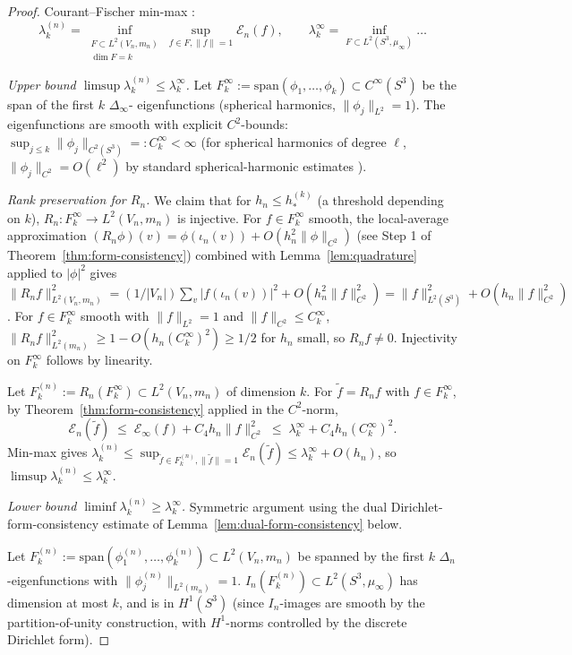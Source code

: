 \documentclass[11pt, a4paper]{amsart}
\theoremstyle{definition}
\begin{document}
\begin{proof}
Courant--Fischer min-max \cite[\S VIII.8]{Kato}:
\[
  \lambda_k^{(n)} = \inf_{\substack{F \subset L^2(V_n, m_n)\\
       \dim F = k}} \sup_{f \in F, \|f\| = 1}
       \mathcal E_n(f),
  \qquad \lambda_k^\infty = \inf_{F \subset L^2(S^3, \mu_\infty)}
       \ldots
\]

\emph{Upper bound $\limsup \lambda_k^{(n)} \leq \lambda_k^\infty$.}
Let $F_k^\infty := \mathrm{span}(\phi_1, \ldots, \phi_k) \subset
C^\infty(S^3)$ be the span of the first $k$ $\Delta_\infty$-
eigenfunctions (spherical harmonics, $\|\phi_j\|_{L^2} = 1$).
The eigenfunctions are smooth with explicit $C^2$-bounds:
$\sup_{j \leq k} \|\phi_j\|_{C^2(S^3)} =: C_k^\infty < \infty$
(for spherical harmonics of degree $\ell$, $\|\phi_j\|_{C^2} =
O(\ell^2)$ by standard spherical-harmonic estimates
\cite[Ch.~III]{BerardSpectralGeometry}).

\emph{Rank preservation for $R_n$.} We claim that for
$h_n \leq h_\ast^{(k)}$ (a threshold depending on $k$),
$R_n \colon F_k^\infty \to L^2(V_n, m_n)$ is injective. For
$f \in F_k^\infty$ smooth, the local-average approximation
$(R_n \phi)(v) = \phi(\iota_n(v)) + O(h_n^2 \|\phi\|_{C^2})$
(see Step 1 of Theorem~\ref{thm:form-consistency}) combined
with Lemma~\ref{lem:quadrature} applied to $|\phi|^2$ gives
$\|R_n f\|_{L^2(V_n, m_n)}^2 = (1/|V_n|)\sum_v |f(\iota_n(v))|^2
+ O(h_n^2 \|f\|_{C^2}^2) = \|f\|_{L^2(S^3)}^2 + O(h_n \|f\|_{C^2}^2)$.
For $f \in F_k^\infty$ smooth with $\|f\|_{L^2} = 1$ and
$\|f\|_{C^2} \leq C_k^\infty$, $\|R_n f\|_{L^2(m_n)}^2 \geq 1
- O(h_n (C_k^\infty)^2) \geq 1/2$ for $h_n$ small, so $R_n f
\neq 0$. Injectivity on $F_k^\infty$ follows by linearity.

Let $F_k^{(n)} := R_n(F_k^\infty) \subset L^2(V_n, m_n)$ of
dimension $k$. For $\tilde f = R_n f$ with $f \in F_k^\infty$,
by Theorem~\ref{thm:form-consistency} applied in the $C^2$-norm,
\[
  \mathcal E_n(\tilde f) \;\leq\; \mathcal E_\infty(f) + C_4 h_n
    \|f\|_{C^2}^2 \;\leq\; \lambda_k^\infty + C_4 h_n
    (C_k^\infty)^2.
\]
Min-max gives $\lambda_k^{(n)} \leq \sup_{\tilde f \in F_k^{(n)},
\|\tilde f\|=1} \mathcal E_n(\tilde f) \leq \lambda_k^\infty +
O(h_n)$, so $\limsup \lambda_k^{(n)} \leq \lambda_k^\infty$.

\emph{Lower bound $\liminf \lambda_k^{(n)} \geq \lambda_k^\infty$.}
Symmetric argument using the dual Dirichlet-form-consistency
estimate of Lemma~\ref{lem:dual-form-consistency} below.

Let $F_k^{(n)} := \mathrm{span}(\phi_1^{(n)}, \ldots,
\phi_k^{(n)}) \subset L^2(V_n, m_n)$ be spanned by the first $k$
$\Delta_n$-eigenfunctions with $\|\phi_j^{(n)}\|_{L^2(m_n)} = 1$.
$I_n(F_k^{(n)}) \subset L^2(S^3, \mu_\infty)$ has dimension at
most $k$, and is in $H^1(S^3)$ (since $I_n$-images are smooth by
the partition-of-unity construction, with $H^1$-norms controlled
by the discrete Dirichlet form).


\end{proof}
\end{document}
